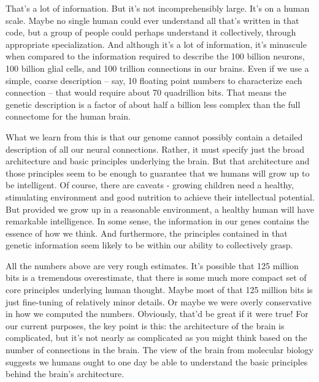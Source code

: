 \documentclass[a4paper,twoside,10pt]{book}
\begin{document}
That's a lot of information. But it's not incomprehensibly large. It's on a human scale. Maybe no single human could ever understand all that's written in that code, but a group of people could perhaps understand it collectively, through appropriate specialization. And although it's a lot of information, it's minuscule when compared to the information required to describe the 100 billion neurons, 100 billion glial cells, and 100 trillion connections in our brains. Even if we use a simple, coarse description -- say, 10 floating point numbers to characterize each connection -- that would require about 70 quadrillion bits. That means the genetic description is a factor of about half a billion less complex than the full connectome for the human brain.

What we learn from this is that our genome cannot possibly contain a detailed description of all our neural connections. Rather, it must specify just the broad architecture and basic principles underlying the brain. But that architecture and those principles seem to be enough to guarantee that we humans will grow up to be intelligent. Of course, there are caveats - growing children need a healthy, stimulating environment and good nutrition to achieve their intellectual potential. But provided we grow up in a reasonable environment, a healthy human will have remarkable intelligence. In some sense, the information in our genes contains the essence of how we think. And furthermore, the principles contained in that genetic information seem likely to be within our ability to collectively grasp.

All the numbers above are very rough estimates. It's possible that 125 million bits is a tremendous overestimate, that there is some much more compact set of core principles underlying human thought. Maybe most of that 125 million bits is just fine-tuning of relatively minor details. Or maybe we were overly conservative in how we computed the numbers. Obviously, that'd be great if it were true! For our current purposes, the key point is this: the architecture of the brain is complicated, but it's not nearly as complicated as you might think based on the number of connections in the brain. The view of the brain from molecular biology suggests we humans ought to one day be able to understand the basic principles behind the brain's architecture.
\end{document}
